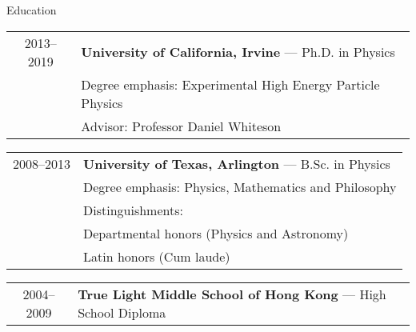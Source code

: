 {\Large Education}\\
\HRule
\vspace{0.25in}

\hspace{0.18in}
\begin{tabular}{c|l}
     2013--2019 & {\bf{University of California, Irvine}} --- Ph.D. in Physics \\
			  & \hspace{0.5cm}Degree emphasis: Experimental High Energy Particle Physics \\
              & \hspace{0.5cm}Advisor: Professor Daniel Whiteson
\end{tabular}

\vspace{0.1in}
\hspace{0.18in}
\begin{tabular}{c|l}
    2008--2013 & {\bf{University of Texas, Arlington}} --- B.Sc. in Physics \\
              & \hspace{0.5cm}Degree emphasis: Physics, Mathematics and Philosophy \\
			  & \hspace{0.5cm}Distinguishments:\\
              & \hspace{0.8cm}Departmental honors (Physics and Astronomy) \\
              & \hspace{0.8cm}Latin honors (Cum laude) \\
\end{tabular}
\vspace{0.11in}

\hspace{0.18in}
\begin{tabular}{c|l}
    2004--2009 & {\bf{True Light Middle School of Hong Kong}} --- High School Diploma \\
\end{tabular}

